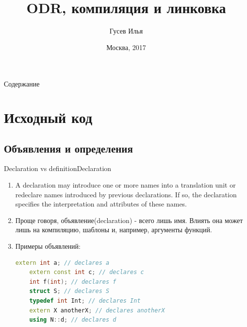 \documentclass[10pt]{beamer}
\title[\href{https://goo.gl/NRgp8K}{https://goo.gl/NRgp8K} (Term 3)]{ODR, компиляция и линковка}
\author[Гусев Илья]{Гусев Илья}
\institute[МФТИ] 
{Московский физико-технический институт\\*}
\date{Москва, 2017}
\begin{document}
\begin{frame}
  \titlepage
\end{frame}

\begin{frame}{Содержание}
\tableofcontents
\end{frame}

\section{Исходный код}
\subsection{Объявления и определения}

\begin{frame}[fragile]{Declaration vs definition}{Declaration}
\begin{enumerate}
\item A declaration may introduce one or more names into a translation unit or redeclare names
introduced by previous declarations. If so, the declaration specifies the interpretation and attributes of these
names.
\item Проще говоря, объявление(declaration) - всего лишь имя. Влиять она может лишь на компиляцию, шаблоны и, например, аргументы функций.
\item {Примеры объявлений:
    \begin{lstlisting}[language=C++]
    extern int a; // declares a
    extern const int c; // declares c
    int f(int); // declares f
    struct S; // declares S
    typedef int Int; // declares Int
    extern X anotherX; // declares anotherX
    using N::d; // declares d
    \end{lstlisting}
}
\end{enumerate}
\end{frame}
\end{document}
